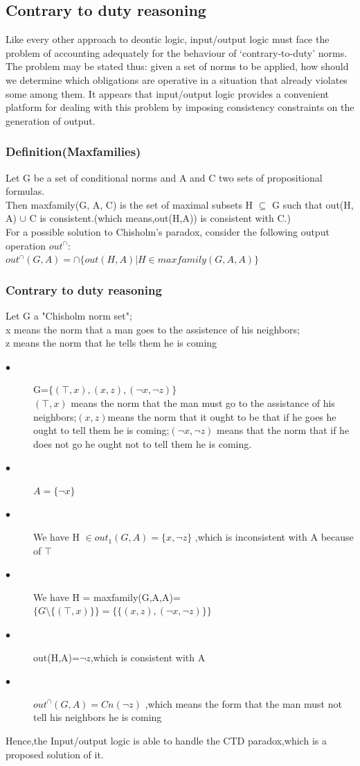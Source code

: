 \documentclass{article}
\begin{document}
\subsection{Contrary to duty reasoning}
Like every other approach to deontic logic, input/output logic must face the problem of accounting adequately for the behaviour of  ‘contrary-to-duty’ norms. The problem may be stated thus: given a set of norms to be applied, how
should we determine which obligations are operative in a situation that already
violates some among them. It appears that input/output logic provides a convenient platform for dealing with this problem by imposing consistency constraints on the generation of output.
\subsubsection{Definition(Maxfamilies)}
Let G be a set of conditional norms and A and C two sets of propositional formulas.\\
Then maxfamily(G, A, C) is the set of maximal
subsets H $\subseteq$ G such that out(H, A) $\cup$ C is consistent.(which means,out(H,A)) is consistent with C.)\\
For a possible solution to Chisholm’s paradox, consider the following output operation $out^{\cap}$:\\
$out^{\cap}(G, A) = \cap
\{out(H, A) | H \in maxfamily(G, A, A)\}
$
\subsubsection{Contrary to duty reasoning}
Let G a "Chisholm norm set";\\
x means the norm that a man goes to the assistence of his neighbors;\\
z means the norm that he tells them he is coming\\
\begin{description}
\item[$\bullet$]G=$\{(\top ,x),(x,z),(\neg x,\neg z)  \}$\\
 $(\top ,x)$ means the norm that the man must go to the assistance of his neighbors;$(x,z)$means the norm that it ought to be that if he goes he ought to tell them he is coming;$(\neg x,\neg z)$ means that the norm that if he does not go he ought not to tell them he is coming.
 \item[$\bullet$] $A=\{ \neg x \}$
 \item[$\bullet$] We have H $\in out_{1}(G,A)=\{x,\neg z\}$ ,which is inconsistent with A because of $\top$
 \item[$\bullet$] We have  H = maxfamily(G,A,A)=$ \{ G\setminus \{(\top,x) \}\}=\{\{(x,z),(\neg x,\neg z)   \}\} $
 \item[$\bullet$] out(H,A)=$\neg z$,which is consistent with A
 \item[$\bullet$]$out^{\cap}(G,A)=Cn(\neg z)$ ,which means the form that the man must not tell his neighbors he is coming
\end{description}
Hence,the Input/output logic is able to handle the CTD paradox,which is a proposed solution of it.
\end{document}
